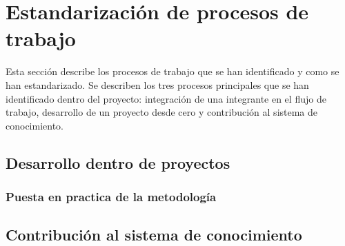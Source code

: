 \section{Estandarización de procesos de trabajo}
Esta sección describe los procesos de trabajo que se
han identificado y como se han estandarizado. Se describen
los tres procesos principales que se han identificado dentro
del proyecto: integración de una integrante en el flujo de trabajo,
desarrollo de un proyecto desde cero y contribución al sistema
de conocimiento.



\subsection{Desarrollo dentro de proyectos}
\subsubsection{Puesta en practica de la metodología}
\subsection{Contribución al sistema de conocimiento}

\pagebreak
